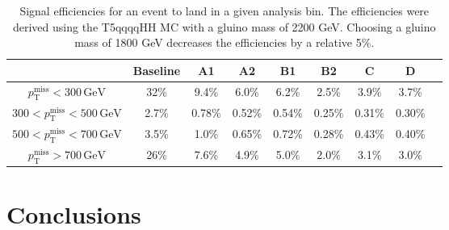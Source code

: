 \begin{table}
\centering
\caption{
Signal efficiencies for an event to land in a given analysis bin.
The efficiencies were derived using the T5qqqqHH MC with a gluino mass of 2200 GeV.
Choosing a gluino mass of 1800 GeV decreases the efficiencies by a relative 5\%.
}
\begin{tabular}{c | c c c c c c c c}
\hline
\hline
                                                            & Baseline & A1     & A2      & B1      & B2      & C       & D\\
\hline
$p_{\mathrm{T}}^{\mathrm{miss}} < 300\,\mathrm{GeV}$        & 32\%    & 9.4\%   & 6.0\%   & 6.2\%   & 2.5\%   & 3.9\%   & 3.7\% \\
$300 < p_{\mathrm{T}}^{\mathrm{miss}} < 500\,\mathrm{GeV}$  & 2.7\%   & 0.78\%  & 0.52\%  & 0.54\%  & 0.25\%  & 0.31\%  & 0.30\% \\
$500 < p_{\mathrm{T}}^{\mathrm{miss}} < 700\,\mathrm{GeV}$  & 3.5\%   & 1.0\%   & 0.65\%  & 0.72\%  & 0.28\%  & 0.43\%  & 0.40\% \\
$p_{\mathrm{T}}^{\mathrm{miss}} > 700\,\mathrm{GeV}$        & 26\%    & 7.6\%   & 4.9\%   & 5.0\%   & 2.0\%   & 3.1\%   & 3.0\% \\
\hline
\hline
\end{tabular}
\label{tab:sigeff}
\end{table}

\section{Conclusions}
